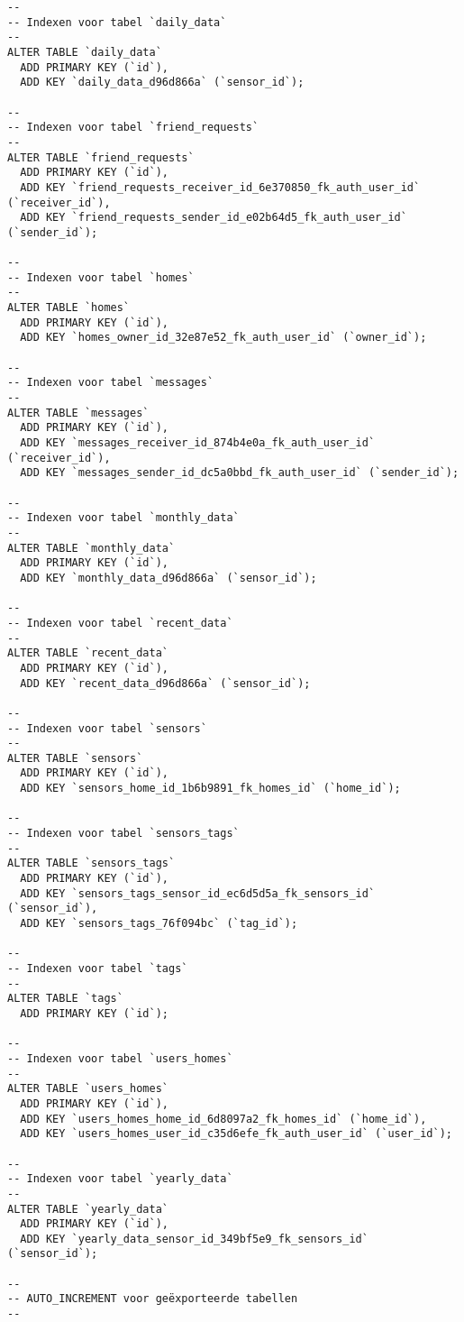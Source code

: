 \documentclass[11pt]{article}
\begin{document}
\begin{lstlisting}[style=SQL]
--
-- Indexen voor tabel `daily_data`
--
ALTER TABLE `daily_data`
  ADD PRIMARY KEY (`id`),
  ADD KEY `daily_data_d96d866a` (`sensor_id`);

--
-- Indexen voor tabel `friend_requests`
--
ALTER TABLE `friend_requests`
  ADD PRIMARY KEY (`id`),
  ADD KEY `friend_requests_receiver_id_6e370850_fk_auth_user_id` (`receiver_id`),
  ADD KEY `friend_requests_sender_id_e02b64d5_fk_auth_user_id` (`sender_id`);

--
-- Indexen voor tabel `homes`
--
ALTER TABLE `homes`
  ADD PRIMARY KEY (`id`),
  ADD KEY `homes_owner_id_32e87e52_fk_auth_user_id` (`owner_id`);

--
-- Indexen voor tabel `messages`
--
ALTER TABLE `messages`
  ADD PRIMARY KEY (`id`),
  ADD KEY `messages_receiver_id_874b4e0a_fk_auth_user_id` (`receiver_id`),
  ADD KEY `messages_sender_id_dc5a0bbd_fk_auth_user_id` (`sender_id`);

--
-- Indexen voor tabel `monthly_data`
--
ALTER TABLE `monthly_data`
  ADD PRIMARY KEY (`id`),
  ADD KEY `monthly_data_d96d866a` (`sensor_id`);

--
-- Indexen voor tabel `recent_data`
--
ALTER TABLE `recent_data`
  ADD PRIMARY KEY (`id`),
  ADD KEY `recent_data_d96d866a` (`sensor_id`);

--
-- Indexen voor tabel `sensors`
--
ALTER TABLE `sensors`
  ADD PRIMARY KEY (`id`),
  ADD KEY `sensors_home_id_1b6b9891_fk_homes_id` (`home_id`);

--
-- Indexen voor tabel `sensors_tags`
--
ALTER TABLE `sensors_tags`
  ADD PRIMARY KEY (`id`),
  ADD KEY `sensors_tags_sensor_id_ec6d5d5a_fk_sensors_id` (`sensor_id`),
  ADD KEY `sensors_tags_76f094bc` (`tag_id`);

--
-- Indexen voor tabel `tags`
--
ALTER TABLE `tags`
  ADD PRIMARY KEY (`id`);

--
-- Indexen voor tabel `users_homes`
--
ALTER TABLE `users_homes`
  ADD PRIMARY KEY (`id`),
  ADD KEY `users_homes_home_id_6d8097a2_fk_homes_id` (`home_id`),
  ADD KEY `users_homes_user_id_c35d6efe_fk_auth_user_id` (`user_id`);

--
-- Indexen voor tabel `yearly_data`
--
ALTER TABLE `yearly_data`
  ADD PRIMARY KEY (`id`),
  ADD KEY `yearly_data_sensor_id_349bf5e9_fk_sensors_id` (`sensor_id`);

--
-- AUTO_INCREMENT voor geëxporteerde tabellen
--


\end{lstlisting}
\end{document}

